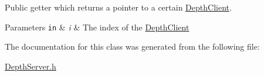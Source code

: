 Public getter which returns a pointer to a certain \hyperlink{class_depth_client}{Depth\+Client}. 


\begin{DoxyParams}[1]{Parameters}
\mbox{\tt in}  & {\em i} & The index of the \hyperlink{class_depth_client}{Depth\+Client} \\
\hline
\end{DoxyParams}


The documentation for this class was generated from the following file\+:\begin{DoxyCompactItemize}
\item 
\hyperlink{_depth_server_8h}{Depth\+Server.\+h}\end{DoxyCompactItemize}
